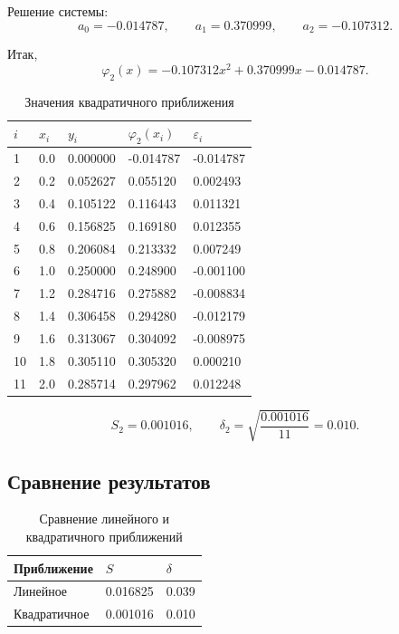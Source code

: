 \documentclass[12pt,a4paper]{article}
\begin{document}
Решение системы:
\[
  a_0=-0.014787,\qquad a_1=0.370999,\qquad a_2=-0.107312.
\]

Итак,
\[
  \boxed{\varphi_2(x)=-0.107312x^2+0.370999x-0.014787}.
\]

\begin{table}[H]
  \centering
  \caption{Значения квадратичного приближения}
  \begin{tabular}{C{0.8cm}C{1.4cm}C{2.2cm}C{2.4cm}C{2.2cm}}
    \toprule
    $i$ & $x_i$ & $y_i$ & $\varphi_2(x_i)$ & $\varepsilon_i$ \\
     & 0.0 & 0.000000 & -0.014787 & -0.014787 \\
    2 & 0.2 & 0.052627 & 0.055120 & 0.002493 \\
    3 & 0.4 & 0.105122 & 0.116443 & 0.011321 \\
    4 & 0.6 & 0.156825 & 0.169180 & 0.012355 \\
    5 & 0.8 & 0.206084 & 0.213332 & 0.007249 \\
    6 & 1.0 & 0.250000 & 0.248900 & -0.001100 \\
    7 & 1.2 & 0.284716 & 0.275882 & -0.008834 \\
    8 & 1.4 & 0.306458 & 0.294280 & -0.012179 \\
    9 & 1.6 & 0.313067 & 0.304092 & -0.008975 \\
    10 & 1.8 & 0.305110 & 0.305320 & 0.000210 \\
    11 & 2.0 & 0.285714 & 0.297962 & 0.012248 \\
    \bottomrule
  \end{tabular}
\end{table}

\[
  S_2=0.001016,\qquad \delta_2=\sqrt{\frac{0.001016}{11}}=\boxed{0.010}.
\]

\subsection{Сравнение результатов}

\begin{table}[H]
  \centering
  \caption{Сравнение линейного и квадратичного приближений}
  \begin{tabular}{C{5.5cm}C{3.2cm}C{3.2cm}}
    \toprule
    \textbf{Приближение} & \textbf{$S$} & \textbf{$\delta$} \\
    \midrule
    Линейное & 0.016825 & 0.039 \\
    Квадратичное & 0.001016 & 0.010 \\
    \bottomrule
  \end{tabular}
\end{table}
\end{document}
